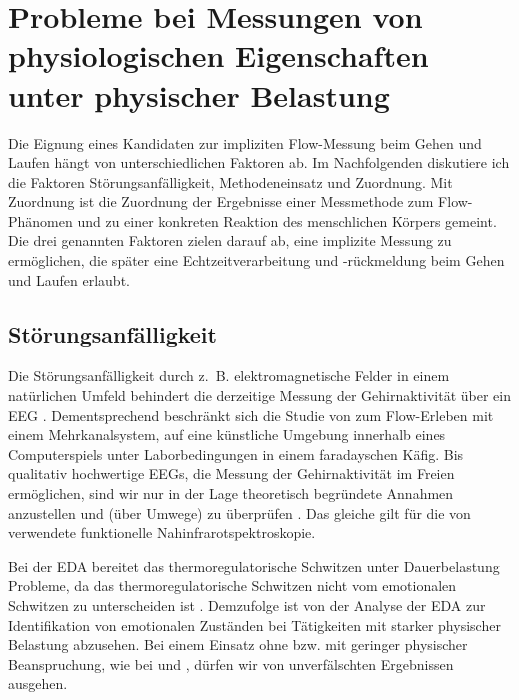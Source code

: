 

\section{Probleme bei Messungen von physiologischen Eigenschaften unter physischer Belastung} 

\label{sec:probleme_bei_messungen}

Die Eignung eines Kandidaten zur impliziten Flow-Messung beim Gehen und Laufen hängt von unterschiedlichen Faktoren ab. Im Nachfolgenden diskutiere ich die Faktoren Störungsanfälligkeit, Methodeneinsatz und Zuordnung. Mit Zuordnung ist die Zuordnung der Ergebnisse einer Messmethode zum Flow-Phänomen und zu einer konkreten Reaktion des menschlichen Körpers gemeint. Die drei genannten Faktoren zielen darauf ab, eine implizite Messung zu ermöglichen, die später eine Echtzeitverarbeitung und -rückmeldung beim Gehen und Laufen erlaubt.

\subsection{Störungsanfälligkeit} 

\label{sub:storungsanfalligkeit}

Die Störungsanfälligkeit durch z.~B. elektromagnetische Felder in einem natürlichen Umfeld behindert die derzeitige Messung der Gehirnaktivität über ein \ac{EEG} \citep[][S.~56]{Henk2014}. Dementsprechend beschränkt sich die Studie von \citet{Hugentobler2011} zum Flow-Erleben mit einem Mehrkanalsystem, auf eine künstliche Umgebung innerhalb eines Computerspiels unter Laborbedingungen in einem faradayschen Käfig. Bis qualitativ hochwertige \acp{EEG}, die Messung der Gehirnaktivität im Freien ermöglichen, sind wir nur in der Lage theoretisch begründete Annahmen anzustellen und (über Umwege) zu überprüfen \citep[][S.~56]{Henk2014}. Das gleiche gilt für die von \citet{Harmat2015} verwendete funktionelle Nahinfrarotspektroskopie.

Bei der \ac{EDA} bereitet das thermoregulatorische Schwitzen unter Dauerbelastung Probleme, da das thermoregulatorische Schwitzen nicht vom emotionalen Schwitzen zu unterscheiden ist \citep{Baumeister2009}. Demzufolge ist von der Analyse der \ac{EDA} zur Identifikation von emotionalen Zuständen bei Tätigkeiten mit starker physischer Belastung abzusehen. Bei einem Einsatz ohne bzw. mit geringer physischer Beanspruchung, wie bei \citet{Kivikangas2006} und \citet{Nacke2008}, dürfen wir von unverfälschten Ergebnissen ausgehen.

